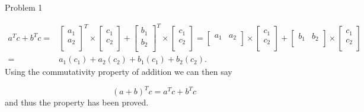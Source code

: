 \begin{problem}{Problem 1}
\begin{Highlight}
        \begin{align}
            a^{T}c + b^{T}c = &
            \begin{bmatrix}
                a_{1} \\
                a_{2} \\
            \end{bmatrix}^{T}
            \times 
            \begin{bmatrix}
                c_{1} \\
                c_{2} \\
            \end{bmatrix}
            + 
            \begin{bmatrix}
                b_{1} \\
                b_{2} \\
            \end{bmatrix}^{T}
            \times
            \begin{bmatrix}
                c_{1} \\
                c_{2} \\
            \end{bmatrix}
            =
            \begin{bmatrix}
                a_{1} & a_{2} \\
            \end{bmatrix}
            \times
            \begin{bmatrix}
                c_{1} \\
                c_{2} \\
            \end{bmatrix}
            +
            \begin{bmatrix}
                b_{1} & b_{2} \\
            \end{bmatrix}
            \times
            \begin{bmatrix}
                c_{1} \\
                c_{2} \\
            \end{bmatrix} \\
            = & a_{1}(c_{1}) + a_{2}(c_{2}) + b_{1}(c_{1}) + b_{2}(c_{2}).
        \end{align}
        Using the commutativity property of addition we can then say

        \begin{equation}
            (a + b)^{T}c = a^{T}c + b^{T}c
        \end{equation}
        and thus the property has been proved.
    \end{Highlight}


\end{problem}
